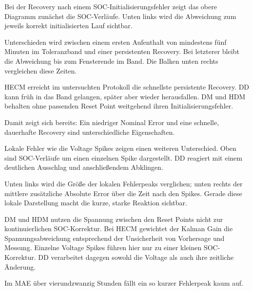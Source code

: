 \begin{sprechtext}

Bei der Recovery nach einem SOC-Initialisierungsfehler zeigt das obere Diagramm zunächst die SOC-Verläufe. Unten links wird die Abweichung zum jeweils korrekt initialisierten Lauf sichtbar.

Unterschieden wird zwischen einem ersten Aufenthalt von mindestens fünf Minuten im Toleranzband und einer persistenten Recovery. Bei letzterer bleibt die Abweichung bis zum Fensterende im Band. Die Balken unten rechts vergleichen diese Zeiten.

HECM erreicht im untersuchten Protokoll die schnellste persistente Recovery. DD kann früh in das Band gelangen, später aber wieder herausfallen. DM und HDM behalten ohne passenden Reset Point weitgehend ihren Initialisierungsfehler.

Damit zeigt sich bereits: Ein niedriger Nominal Error und eine schnelle, dauerhafte Recovery sind unterschiedliche Eigenschaften.

\end{sprechtext}


\begin{sprechtext}

Lokale Fehler wie die Voltage Spikes zeigen einen weiteren Unterschied. Oben sind SOC-Verläufe um einen einzelnen Spike dargestellt. DD reagiert mit einem deutlichen Ausschlag und anschließendem Abklingen.

Unten links wird die Größe der lokalen Fehlerpeaks verglichen; unten rechts der mittlere zusätzliche Absolute Error über die Zeit nach den Spikes. Gerade diese lokale Darstellung macht die kurze, starke Reaktion sichtbar.

DM und HDM nutzen die Spannung zwischen den Reset Points nicht zur kontinuierlichen SOC-Korrektur. Bei HECM gewichtet der Kalman Gain die Spannungsabweichung entsprechend der Unsicherheit von Vorhersage und Messung. Einzelne Voltage Spikes führen hier nur zu einer kleinen SOC-Korrektur. DD verarbeitet dagegen sowohl die Voltage als auch ihre zeitliche Änderung.

Im MAE über vierundzwanzig Stunden fällt ein so kurzer Fehlerpeak kaum auf.

\end{sprechtext}


